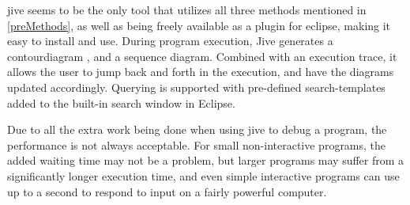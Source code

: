 \begin{sloppypar}
\Gls{jive} seems to be the only tool that utilizes all three methods mentioned in \autoref{preMethods}, as well as being freely available as a plugin for eclipse, making it easy to install and use.
During program execution, Jive generates a \gls{contourdiagram} \cite{Jayaraman1996}, and a sequence diagram.
Combined with an execution trace, it allows the user to jump back and forth in the execution, and have the diagrams updated accordingly.
Querying is supported with pre-defined search-templates added to the built-in search window in Eclipse.
~\\
\end{sloppypar}

Due to all the extra work being done when using jive to debug a program, the performance is not always acceptable.
For small non-interactive programs, the added waiting time may not be a problem, but larger programs may suffer from a significantly longer execution time, and even simple interactive programs can use up to a second to respond to input on a fairly powerful computer.
~\\






